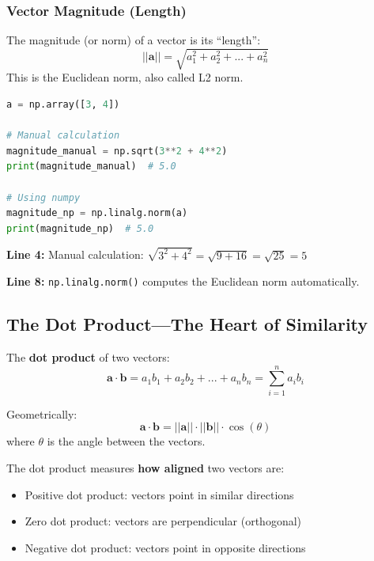 \documentclass[12pt,a4paper]{article}
\begin{document}
\subsubsection{Vector Magnitude (Length)}

\begin{mathbox}
The magnitude (or norm) of a vector is its ``length'':
\[
||\mathbf{a}|| = \sqrt{a_1^2 + a_2^2 + ... + a_n^2}
\]
This is the Euclidean norm, also called L2 norm.
\end{mathbox}

\begin{lstlisting}[language=Python,caption={Vector magnitude}]
a = np.array([3, 4])

# Manual calculation
magnitude_manual = np.sqrt(3**2 + 4**2)
print(magnitude_manual)  # 5.0

# Using numpy
magnitude_np = np.linalg.norm(a)
print(magnitude_np)  # 5.0
\end{lstlisting}

\begin{explanation}
\textbf{Line 4:} Manual calculation: $\sqrt{3^2 + 4^2} = \sqrt{9 + 16} = \sqrt{25} = 5$

\textbf{Line 8:} \texttt{np.linalg.norm()} computes the Euclidean norm automatically.
\end{explanation}

\subsection{The Dot Product---The Heart of Similarity}

\begin{mathbox}
The \textbf{dot product} of two vectors:
\[
\mathbf{a} \cdot \mathbf{b} = a_1 b_1 + a_2 b_2 + ... + a_n b_n = \sum_{i=1}^{n} a_i b_i
\]

Geometrically:
\[
\mathbf{a} \cdot \mathbf{b} = ||\mathbf{a}|| \cdot ||\mathbf{b}|| \cdot \cos(\theta)
\]
where $\theta$ is the angle between the vectors.
\end{mathbox}

\begin{concept}
The dot product measures \textbf{how aligned} two vectors are:
\begin{itemize}
    \item Positive dot product: vectors point in similar directions
    \item Zero dot product: vectors are perpendicular (orthogonal)
    \item Negative dot product: vectors point in opposite directions
\end{itemize}
\end{concept}
\end{document}
